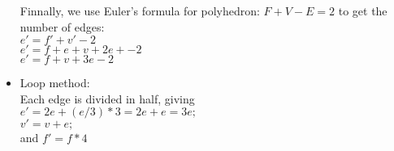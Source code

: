 \begin{itemize}
Finnally, we use Euler's formula for polyhedron: $F+V-E=2$ to get the number of edges: \\
$e'=f'+v'-2$ \\
$e'=f+e+v + 2e + -2$ \\
$e'= f + v + 3e -2$ \\


\item Loop method: \\
Each edge is divided in half, giving  \\
$e' = 2e + (e/3)*3 = 2e+ e = 3e;$ \\
$v' = v+e;$ \\
and $f' = f*4$ \\
\end{itemize}
